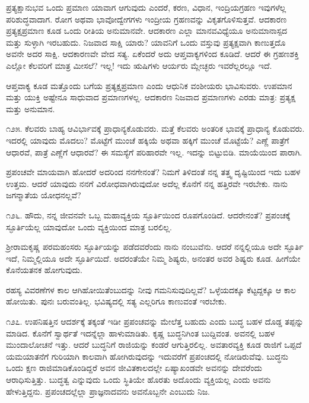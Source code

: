 ಪ್ರತ್ಯಕ್ಷಾನುಭವ ಒಂದು ಪ್ರಮಾಣ ಯಾವಾಗ ಆಗುವುದು ಎಂದರೆ, ಕರಣ, ವಿಧಾನ, ಇಂದ್ರಿಯಗ್ರಹಣ ಇವುಗಳೆಲ್ಲ ಪರಿಶುದ್ಧವಾದಾಗ. ರೋಗ ಅಥವಾ ಭಾವೋದ್ವೇಗಗಳು ಇಂದ್ರೀಯ ಗ್ರಹಣವನ್ನು ವಿಕೃತಗೊಳಿಸುತ್ತವೆ. ಆದಕಾರಣ ಪ್ರತ್ಯಕ್ಷಪ್ರಮಾಣ ಕೂಡ ಒಂದು ರೀತಿಯ ಅನುಮಾನವೇ. ಆದಕಾರಣ ಎಲ್ಲಾ ಮಾನವವಿಧ್ಯೆಯೂ ಅನುಮಾನಾಸ್ಪದ ಮತ್ತು ಸುಳ್ಳಾಗಿ ಇರಬಹುದು. ನಿಜವಾದ ಸಾಕ್ಷಿ ಯಾರು? ಯಾವನಿಗೆ ಒಂದು ವಸ್ತುವು ಪ್ರತ್ಯಕ್ಷವಾಗಿ ಕಾಣುತ್ತದೊ ಅವನೇ ಅದರ ಸಾಕ್ಷಿ. ಆದಕಾರಣವೇ ವೇದ ಸತ್ಯ. ಏಕೆಂದರೆ ಅದು ಆಪ್ತವಾಕ್ಯಗಳಿಂದ ಕೂಡಿದೆ. ಆದರೆ ಈ ಗ್ರಹಣಶಕ್ತಿ ಎಲ್ಲೋ ಕೆಲವರಿಗೆ ಮಾತ್ರ ಮೀಸಲೆ? ಇಲ್ಲ! ಇದು ಋಷಿಗಳು ಆರ್ಯರು ಮ್ಲೇಚ್ಛರು ಇವರೆಲ್ಲರಲ್ಲೂ ಇದೆ.

ಆಪ್ತವಾಕ್ಯ ಕೂಡ ಮತ್ತೊಂದು ಬಗೆಯ ಪ್ರತ್ಯಕ್ಷಪ್ರಮಾಣ ಎಂದು ಆಧುನಿಕ ವಂಶೀಯರು ಭಾವಿಸುವರು. ಉಪಮಾನ ಮತ್ತು ಯುಕ್ತಿ ಅಷ್ಟೇನೂ ಸಾಧುವಾದ ಪ್ರಮಾಣಗಳಲ್ಲ. ಆದಕಾರಣ ನಿಜವಾದ ಪ್ರಮಾಣಗಳು ಎರಡು ಮಾತ್ರ: ಪ್ರತ್ಯಕ್ಷ ಮತ್ತು ಅನುಮಾನ.

೧೨೫. ಕೆಲವರು ಬಾಹ್ಯ ಆವಿರ್ಭಾವಕ್ಕೆ ಪ್ರಾಧಾನ್ಯಕೊಡುವರು. ಮತ್ತೆ ಕೆಲವರು ಅಂತರಿಕ ಭಾವಕ್ಕೆ ಪ್ರಾಧಾನ್ಯ ಕೊಡುವರು. ಇದರಲ್ಲಿ ಯಾವುದು ಮೊದಲು? ಮೊಟ್ಟೆಗೆ ಮುಂಚೆ ಹಕ್ಕಿಯೆ ಅಥವಾ ಹಕ್ಕಿಗೆ ಮುಂಚೆ ಮೊಟ್ಟೆಯೆ? ಎಣ್ಣೆ ಪಾತ್ರೆಗೆ ಆಧಾರವೆ, ಪಾತ್ರೆ ಎಣ್ಣೆಗೆ ಆಧಾರವೆ? ಈ ಸಮಸ್ಯೆಗೆ ಪರಿಹಾರವೇ ಇಲ್ಲ. ಇದನ್ನು ಬಿಟ್ಟುಬಿಡಿ. ಮಾಯೆಯಿಂದ ಪಾರಾಗಿ.

ಪ್ರಪಂಚವೇ ಮಾಯವಾಗಿ ಹೋದರೆ ಅದರಿಂದ ನನಗೇನಂತೆ? ನಿಮಗೆ ತಿಳಿದಂತೆ ನನ್ನ ತತ್ತ್ವ ದೃಷ್ಟಿಯಿಂದ ಇದು ಬಹಳ ಉತ್ತಮ. ಆದರೆ ಯಾವುದು ನನಗೆ ವಿರೋಧವಾಗಿರುವುದೋ ಅದೆಲ್ಲ ಕೊನೆಗೆ ನನ್ನ ಹತ್ತಿರವೇ ಇರಬೇಕು. ನಾನು ಜಗನ್ಮಾತೆಯ ಯೋಧನಲ್ಲವೆ?

೧೨೬. ಹೌದು, ನನ್ನ ಜೀವನವೇ ಒಬ್ಬ ಮಹಾವ್ಯಕ್ತಿಯ ಸ್ಫೂರ್ತಿಯಿಂದ ರೂಪಗೊಂಡಿದೆ. ಆದರೇನಂತೆ? ಪ್ರಪಂಚಕ್ಕೆ ಸ್ಫೂರ್ತಿಯೆಲ್ಲ ಯಾವುದೋ ಒಂದು ವ್ಯಕ್ತಿಯಿಂದ ಮಾತ್ರ ಬರಲಿಲ್ಲ.

ಶ‍್ರೀರಾಮಕೃಷ್ಣ ಪರಮಹಂಸರು ಸ್ಫೂರ್ತಿಯನ್ನು ಪಡೆದವರೆಂದು ನಾನು ನಂಬುವೆನು. ಆದರೆ ನನ್ನಲ್ಲಿಯೂ ಅದೇ ಸ್ಫೂರ್ತಿ ಇದೆ, ನಿಮ್ಮಲ್ಲಿಯೂ ಅದೇ ಸ್ಫೂರ್ತಿಯಿದೆ. ಅದರಂತೆಯೇ ನಿಮ್ಮ ಶಿಷ್ಯರು, ಅನಂತರ ಅವರ ಶಿಷ್ಯರು ಕೂಡ. ಹೀಗೆಯೇ ಕೊನೆಯತನಕ ಹೋಗುವುದು.

ರಹಸ್ಯ ವಿವರಣೆಗಳ ಕಾಲ ಆಗಿಹೋಯಿತೆಂಬುದನ್ನು ನೀವು ಗಮನಿಸುವುದಿಲ್ಲವೆ? ಒಳ್ಳೆಯದಕ್ಕೂ ಕೆಟ್ಟದ್ದಕ್ಕೂ ಆ ಕಾಲ ಹೋಯಿತು. ಪುನಃ ಬರುವಂತಿಲ್ಲ. ಭವಿಷ್ಯದಲ್ಲಿ ಸತ್ಯ ಎಲ್ಲರಿಗೂ ಕಾಣುವಂತೆ ಇರಬೇಕು.

೧೨೭. ಉಪನಿಷತ್ತಿನ ಆದರ್ಶಕ್ಕೆ ತಕ್ಕಂತೆ ಇಡೀ ಪ್ರಪಂಚವನ್ನು ಮೇಲೆತ್ತ ಬಹುದು ಎಂದು ಬುದ್ಧ ಬಹಳ ದೊಡ್ಡ ತಪ್ಪನ್ನು ಮಾಡಿದ. ಕೊನೆಗೆ ಸ್ವಾರ್ಥತೆ ಇದನ್ನೆಲ್ಲಾ ಹಾಳುಮಾಡಿತು. ಕೃಷ್ಣ ಬುದ್ಧನಿಗಿಂತ ಬುದ್ದಿವಂತ. ಅವನಲ್ಲಿ ಬಹಳ ಮುಂದಾಲೋಚನೆ ಇತ್ತು. ಆದರೆ ಬುದ್ಧನಿಗೆ ರಾಜಿಯನ್ನು ಕಂಡರೆ ಆಗುತ್ತಿರಲಿಲ್ಲ. ಅವತಾರವ್ಯಕ್ತಿ ಕೂಡ ರಾಜಿಗೆ ಒಪ್ಪದೆ ಯಮಯಾತನೆಗೆ ಗುರಿಯಾಗಿ ಕಾಲವಾಗಿ ಹೋಗಿರುವುದನ್ನು ಇದುವರೆಗೆ ಪ್ರಪಂಚದಲ್ಲಿ ನೋಡಿರುವೆವು. ಬುದ್ಧನು ಒಂದು ಕ್ಷಣ ರಾಜಿಮಾಡಿಕೊಂಡಿದ್ದರೆ ಅವನ ಜೀವಿತಕಾಲದಲ್ಲೇ ಏಷ್ಯಾಖಂಡವೇ ಅವನನ್ನು ದೇವರೆಂದು ಆರಾಧಿಸುತ್ತಿತ್ತು. ಬುದ್ಧತ್ವ ಎನ್ನುವುದು ಒಂದು ಸ್ಥಿತಿಯೇ ಹೊರತು ಅದೊಂದು ವ್ಯಕ್ತಿಯಲ್ಲ ಎಂದು ಅವನು ಹೇಳುತ್ತಿದ್ದನು. ಪ್ರಪಂಚದಲ್ಲೆಲ್ಲಾ ಪ್ರಾಜ್ಞನಾದವನು ಅವನೊಬ್ಬನೇ ಎಂಬುದು ನಿಜ.

